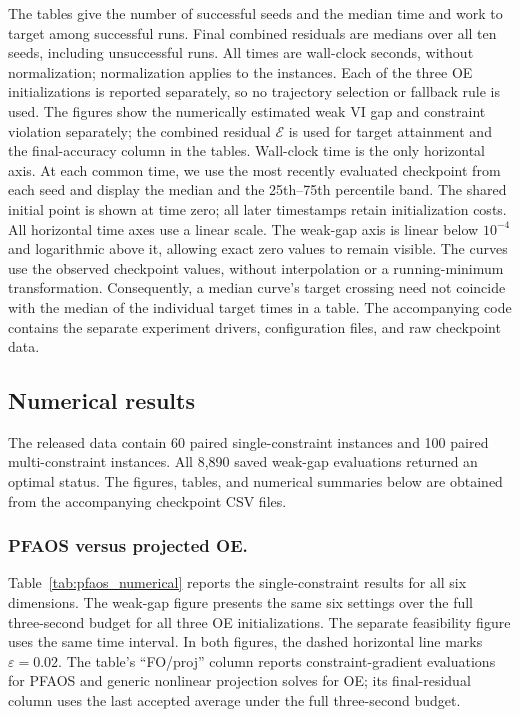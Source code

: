 The tables give the number of successful seeds and the median time and
work to target among successful runs. Final combined residuals are medians over
all ten seeds, including unsuccessful runs. All times are wall-clock seconds,
without normalization; normalization applies to the instances. Each of the
three OE initializations is reported separately, so no trajectory selection
or fallback rule is used. The figures show the numerically estimated weak VI
gap and constraint violation separately; the combined residual $\mathcal E$
is used for target attainment and the final-accuracy column in the tables.
Wall-clock time is the only
horizontal axis. At each common time, we use the most recently evaluated
checkpoint from each seed and display the median and the 25th--75th
percentile band. The shared initial point is shown at time zero; all
later timestamps retain initialization costs. All horizontal time axes use a linear scale. The weak-gap axis is linear below $10^{-4}$ and
logarithmic above it, allowing exact zero values to remain visible. The
curves use the observed checkpoint values, without interpolation or a
running-minimum transformation. Consequently, a median curve's target
crossing need not coincide with the median of the individual target
times in a table. The accompanying code contains the separate experiment
drivers, configuration files, and raw checkpoint data.

\subsection{Numerical results}\label{subsec:numerical_results}

The released data contain 60 paired single-constraint instances and
100 paired multi-constraint instances. All 8,890 saved weak-gap evaluations
returned an optimal status. The figures, tables, and numerical summaries
below are obtained from the accompanying checkpoint CSV files.

\subsubsection{PFAOS versus projected OE.}
Table~\ref{tab:pfaos_numerical} reports the single-constraint results
for all six dimensions. The weak-gap figure presents the same six
settings over the full three-second budget for all three OE initializations. The separate feasibility figure uses
the same time interval. In both figures, the dashed horizontal line
marks $\varepsilon=0.02$. The table's ``FO/proj'' column reports
constraint-gradient evaluations for PFAOS and generic nonlinear
projection solves for OE; its final-residual column uses the last
accepted average under the full three-second budget.

